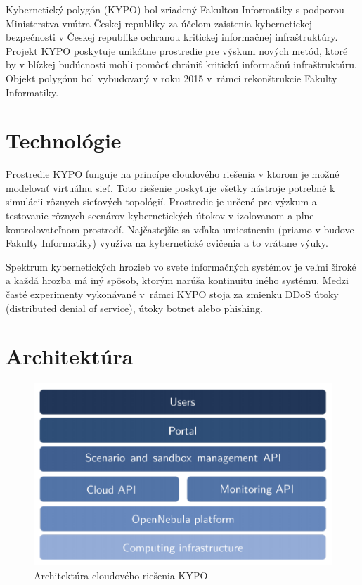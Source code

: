 \documentclass[
  digital, %
  twoside, %
  notable,   %
  nolof,   %
  nolot,   %
]{fithesis3}
\begin{document}
Kybernetický polygón (KYPO) bol zriadený Fakultou Informatiky s podporou Ministerstva vnútra Českej republiky za účelom zaistenia kybernetickej bezpečnosti v Českej republike ochranou kritickej informačnej infraštruktúry. Projekt KYPO poskytuje unikátne prostredie pre výskum nových metód, ktoré by v blízkej budúcnosti mohli pomôcť chrániť kritickú informačnú infraštruktúru\cite{dankovvcikova2015konfigurace}. Objekt polygónu bol vybudovaný v roku 2015 v~rámci rekonštrukcie Fakulty Informatiky.

\section{Technológie}
Prostredie KYPO funguje na princípe cloudového riešenia v ktorom je možné modelovať virtuálnu sieť\cite{eichler2014analytical}. Toto riešenie poskytuje všetky nástroje potrebné k simulácii rôznych sieťových topológií. Prostredie je určené pre výzkum a testovanie rôznych scenárov kybernetických útokov v izolovanom a plne kontrolovateľnom prostredí\cite{vceleda2015kypo}. Najčastejšie sa vďaka umiestneniu (priamo v budove Fakulty Informatiky) využíva na kybernetické cvičenia a to vrátane výuky.

Spektrum kybernetických hrozieb vo svete informačných systémov je veľmi široké a každá hrozba má iný spôsob, ktorým narúša kontinuitu iného systému. Medzi časté experimenty vykonávané v~rámci KYPO stoja za zmienku DDoS útoky (distributed denial of service), útoky botnet alebo phishing\cite{vcegan2014navrh, celeda2013projekt}.

\section{Architektúra}
\begin{figure}
	\center
	\includegraphics[width=1.0\linewidth]{kypo_structure}
	\caption{Architektúra cloudového riešenia KYPO\cite{vceleda2015kypo}}
	\label{kypo_structure}
\end{figure}
\end{document}
